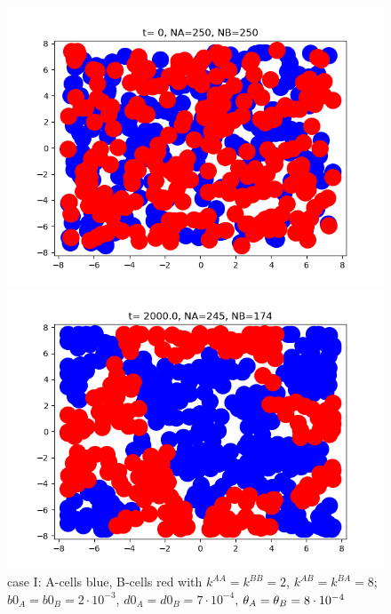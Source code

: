 \begin{figure}[htb]
	\begin{minipage}[t]{.45\textwidth}
		\centering
		\includegraphics[width=\textwidth]{micro_caseI_ini2}
	\end{minipage}
	\hfill
	\begin{minipage}[t]{.45\textwidth}
		\centering
		\includegraphics[width=\textwidth]{micro_caseI_fin2}
	\end{minipage}  
	\label{fig:1-2}
	\caption{{case I: A-cells blue, B-cells red with $k^{AA}=k^{BB}=2 $, $k^{AB}=k^{BA}=8$; $b0_A=b0_B=2\cdot10^{-3}$, $d0_A=d0_B=7\cdot10^{-4}$, ${\theta}_A={\theta}_B=8\cdot 10^{-4}$}	}
\end{figure}


